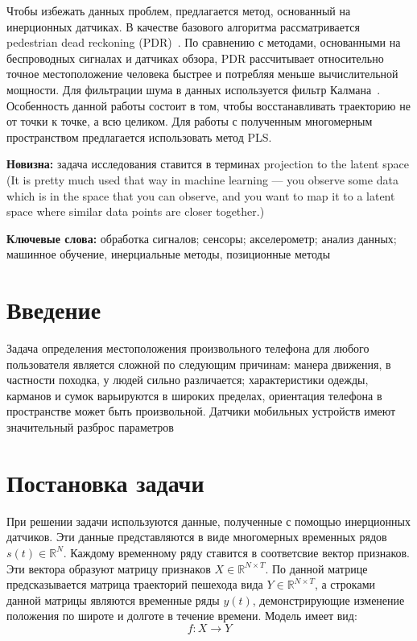 \documentclass{article}
\begin{document}
Чтобы избежать данных проблем, предлагается метод, основанный на инерционных датчиках. В качестве базового алгоритма рассматривается pedestrian dead reckoning (PDR)~\cite{7743695}. По сравнению с методами, основанными на беспроводных сигналах и датчиках обзора, PDR рассчитывает относительно точное местоположение человека быстрее и потребляя меньше вычислительной мощности. Для фильтрации шума в данных используется фильтр Калмана~\cite{journals/corr/abs-1712-09004}. Особенность данной работы состоит в том, чтобы восстанавливать траекторию не от точки к точке, а всю целиком. Для работы с полученным многомерным пространством предлагается использовать метод PLS\cite{10.1007/11752790_2}.


{\bf Новизна:} задача исследования ставится в терминах projection to the latent space (It is pretty much used that way in machine learning — you observe some data which is in the space that you can observe, and you want to map it to a latent space where similar data points are closer together.)



{\bf Ключевые слова:} обработка сигналов; сенсоры; акселерометр; анализ данных; машинное обучение, инерциальные методы, позиционные методы
\section{Введение}

Задача определения местоположения произвольного телефона для любого пользователя
является сложной по следующим причинам: манера движения, в частности походка,
у людей сильно различается; характеристики одежды, карманов и сумок варьируются
в широких пределах, ориентация телефона в пространстве может быть произвольной.
Датчики мобильных устройств имеют значительный разброс параметров

\section{Постановка задачи}

При решении задачи используются данные, полученные с помощью инерционных датчиков. Эти данные представляются в виде многомерных временных рядов $s(t) \in \mathbb{R}^N$. Каждому временному ряду ставится в соответсвие вектор признаков. Эти вектора образуют матрицу признаков $X \in \mathbb{R}^{N \times T}.$ По данной матрице предсказывается матрица траекторий пешехода вида $Y \in \mathbb{R}^{N \times T}$, а строками данной матрицы являются временные ряды $y(t)$, демонстрирующие изменение положения по широте и долготе в течение времени. Модель имеет вид:  \[f: X \to Y\]
\end{document}
